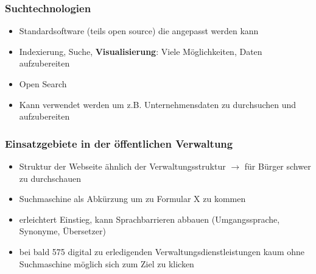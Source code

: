 \subsubsection{Suchtechnologien}

\begin{itemize}
  \item Standardsoftware (teils open source) die angepasst werden kann
  \item Indexierung, Suche, \textbf{Visualisierung}: Viele Möglichkeiten, Daten aufzubereiten
  \item Open Search
  \item Kann verwendet werden um z.B. Unternehmensdaten zu durchsuchen und aufzubereiten
\end{itemize}


\subsubsection{Einsatzgebiete in der öffentlichen Verwaltung}

\begin{itemize}
  \item Struktur der Webseite ähnlich der Verwaltungsstruktur $\rightarrow$ für Bürger schwer zu durchschauen
  \item Suchmaschine als Abkürzung um zu Formular X zu kommen
  \item erleichtert Einstieg, kann Sprachbarrieren abbauen (Umgangssprache, Synonyme, Übersetzer)
  \item bei bald 575 digital zu erledigenden Verwaltungsdienstleistungen kaum ohne Suchmaschine möglich sich zum Ziel zu klicken
\end{itemize}